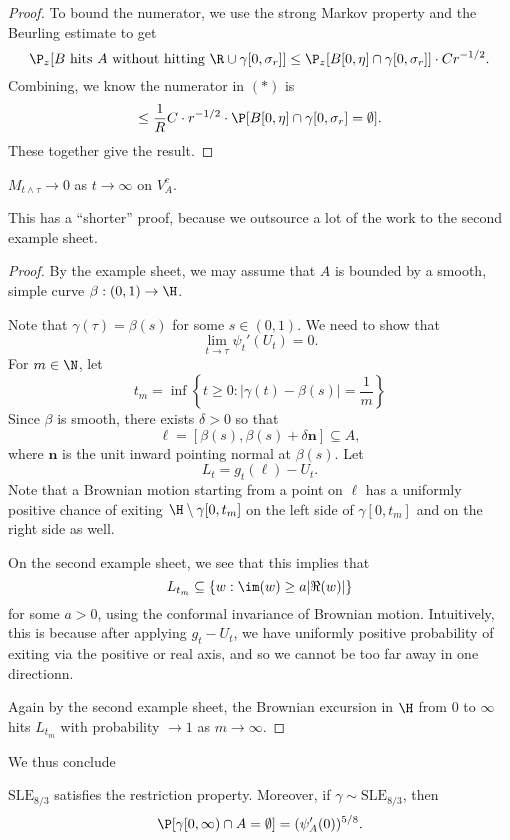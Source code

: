 \documentclass[a4paper]{article}
\newcommand\SLE{\mathrm{SLE}}
\begin{document}
\begin{proof}
  To bound the numerator, we use the strong Markov property and the Beurling estimate to get
  \[
    \P_z[B\text{ hits $A$ without hitting }\R \cup \gamma[0, \sigma_r]] \leq \P_z[B[0, \eta] \cap \gamma[0, \sigma_r]] \cdot C r^{-1/2}.
  \]
  Combining, we know the numerator in $(*)$ is
  \[
    \leq \frac{1}{R} C \cdot r^{-1/2} \cdot \P[B[0, \eta] \cap \gamma[0, \sigma_r] = \emptyset].
  \]
  These together give the result.
\end{proof}

\begin{lemma}
  $M_{t \wedge \tau} \to 0$ as $t \to \infty$ on $V_A^c$.
\end{lemma}

This has a ``shorter'' proof, because we outsource a lot of the work to the second example sheet.
\begin{proof}
  By the example sheet, we may assume that $A$ is bounded by a smooth, simple curve $\beta: (0, 1) \to \H$.

  Note that $\gamma(\tau) = \beta(s)$ for some $s \in (0, 1)$. We need to show that
  \[
    \lim_{t \to \tau} \psi_t'(U_t) = 0.
  \]
  For $m \in \N$, let
  \[
    t_m = \inf \left\{t \geq 0 : |\gamma(t) - \beta(s)| = \frac{1}{m}\right\}
  \]
  Since $\beta$ is smooth, there exists $\delta > 0$ so that
  \[
    \ell = [\beta (s), \beta(s) + \delta \mathbf{n}] \subseteq A,
  \]
  where $\mathbf{n}$ is the unit inward pointing normal at $\beta(s)$. Let
  \[
    L_t = g_t(\ell) - U_t.
  \]
  Note that a Brownian motion starting from a point on $\ell$ has a uniformly positive chance of exiting $\H \setminus \gamma[0 ,t_m]$ on the left side of $\gamma[0, t_m]$ and on the right side as well.

  On the second example sheet, we see that this implies that
  \[
    L_{t_m} \subseteq \{w : \im (w) \geq a |\Re(w)|\}
  \]
  for some $a > 0$, using the conformal invariance of Brownian motion. Intuitively, this is because after applying $g_t - U_t$, we have uniformly positive probability of exiting via the positive or real axis, and so we cannot be too far away in one directionn.

  Again by the second example sheet, the Brownian excursion in $\H$ from $0$ to $\infty$ hits $L_{t_m}$ with probability $\to 1$ as $m \to \infty$.
\end{proof}

We thus conclude
\begin{thm}
  $\SLE_{8/3}$ satisfies the restriction property. Moreover, if $\gamma \sim \SLE_{8/3}$, then
  \[
    \P[\gamma[0, \infty) \cap A = \emptyset] = (\psi_A'(0))^{5/8}.\qedhere
  \]
\end{thm}
\end{document}
